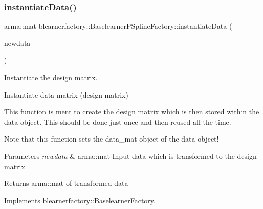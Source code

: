 \subsubsection{\texorpdfstring{instantiate\+Data()}{instantiateData()}}
{\footnotesize\ttfamily arma\+::mat blearnerfactory\+::\+Baselearner\+P\+Spline\+Factory\+::instantiate\+Data (\begin{DoxyParamCaption}\item[{const arma\+::mat \&}]{newdata }\end{DoxyParamCaption})\hspace{0.3cm}{\ttfamily [virtual]}}



Instantiate the design matrix. 

Instantiate data matrix (design matrix)

This function is ment to create the design matrix which is then stored within the data object. This should be done just once and then reused all the time.

Note that this function sets the {\ttfamily data\+\_\+mat} object of the data object!


\begin{DoxyParams}{Parameters}
{\em newdata} & {\ttfamily arma\+::mat} Input data which is transformed to the design matrix\\
\hline
\end{DoxyParams}
\begin{DoxyReturn}{Returns}
{\ttfamily arma\+::mat} of transformed data 
\end{DoxyReturn}


Implements \mbox{\hyperlink{classblearnerfactory_1_1_baselearner_factory_ac4a38c4815fb33b8d4785745117c5e57}{blearnerfactory\+::\+Baselearner\+Factory}}.

